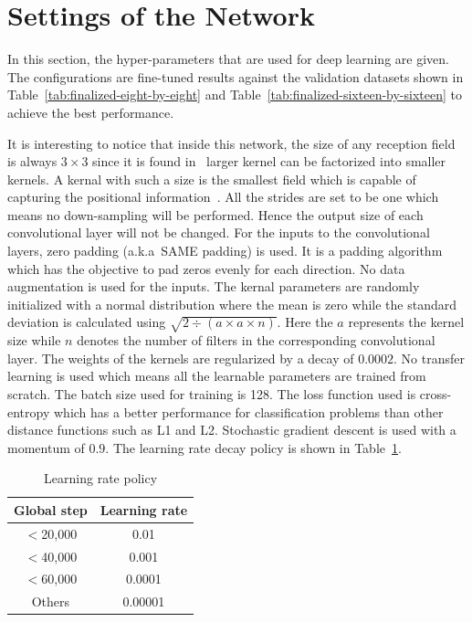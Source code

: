 \section{Settings of the Network}\label{sec:config}
In this section, the hyper-parameters that are
used for deep learning are given.
The configurations are fine-tuned results against the validation
datasets shown in Table~\ref{tab:finalized-eight-by-eight}
and Table~\ref{tab:finalized-sixteen-by-sixteen} to achieve the
best performance.

It is interesting to notice that inside this network, 
the size of any reception field
is always \(3\times3\) since it is found in~\parencite{RN62}
larger kernel can be factorized into smaller kernels.
A kernal with such a size is the smallest
field which is capable of capturing the positional
information~\parencite{RN107}.
All the strides are set to be one which means
no down-sampling will be performed. 
Hence the output size of each convolutional layer
will not be changed.
For the inputs to the convolutional layers, 
zero padding (a.k.a\ SAME padding) is used.
It is a padding algorithm which has the objective
to pad zeros evenly for each direction.
No data augmentation is used for the inputs.
The kernal parameters are randomly initialized 
with a normal distribution where the mean 
is zero while the standard deviation is 
calculated using 
\(\sqrt{2\div(\mathit{a}\times\mathit{a}\times\mathit{n})}\).
Here the \(\mathit{a}\) represents the kernel size
while \(\mathit{n}\) denotes the number of filters
in the corresponding convolutional layer.
The weights of the kernels are regularized by
a decay of \(0.0002\).
No transfer learning is used which means all the learnable 
parameters are trained from scratch.
The batch size used for training is 128.
The loss function used is cross-entropy which has
a better performance for classification problems 
than other distance functions such as L1 and L2.
Stochastic gradient descent is used with a momentum 
of \(0.9\).
The learning rate decay policy is shown in 
Table~\ref{tab:lr-policy}.

\begin{table}[H]
    \caption{Learning rate policy}
    \bigskip\label{tab:lr-policy}
    \centering
    \begin{tabular}{c c}
        \toprule
        Global step & Learning rate \\
        \midrule
        \(<\)20,000 & 0.01 \\
        \(<\)40,000 & 0.001 \\
        \(<\)60,000 & 0.0001 \\
        Others  & 0.00001 \\
        \bottomrule
    \end{tabular}
\end{table}

